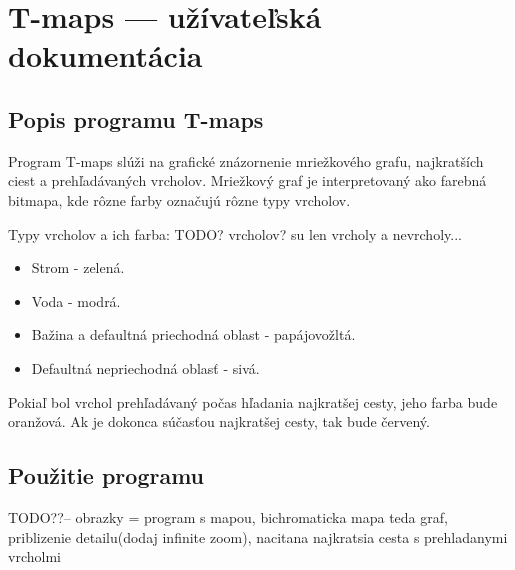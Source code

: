 \chapter{T-maps --- užívateľská dokumentácia}
\label{userdoc}
\section{Popis programu T-maps}
Program T-maps slúži na grafické znázornenie mriežkového grafu, najkratších ciest a prehľadávaných vrcholov.
Mriežkový graf je interpretovaný ako farebná bitmapa, kde rôzne farby označujú rôzne typy vrcholov.

Typy vrcholov a ich farba: TODO? vrcholov? su len vrcholy a nevrcholy...
\begin{itemize}
\item Strom - zelená.
\item Voda - modrá.
\item Bažina a defaultná priechodná oblast - papájovožltá.
\item Defaultná nepriechodná oblasť - sivá.

\end{itemize}

Pokiaľ bol vrchol prehľadávaný počas hľadania najkratšej cesty, jeho farba bude oranžová. Ak je dokonca súčasťou najkratšej cesty, 
tak bude červený.

\section{Použitie programu}

TODO??-- obrazky = program s mapou, bichromaticka mapa teda graf, priblizenie detailu(dodaj infinite zoom), nacitana najkratsia cesta s prehladanymi vrcholmi
